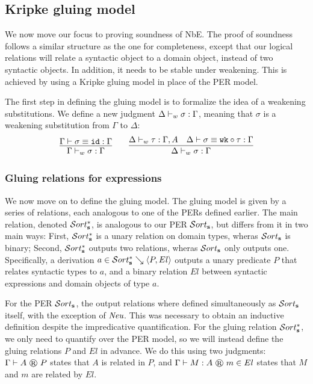 \subsection{Kripke gluing model}

We now move our focus to proving soundness of \ac{NbE}.
The proof of soundness follows a similar structure as the one for completeness,
  except that our logical relations will relate a syntactic object to a domain object, instead of two syntactic objects.
In addition, it needs to be stable under weakening.
This is achieved by using a Kripke gluing model in place of the PER model.

The first step in defining the gluing model is to formalize the idea of a weakening substitutions.
We define a new judgment $\Delta \vdash_{w} \sigma : \Gamma$, meaning that $\sigma$ is a weakening substitution from $\Gamma$ to $\Delta$:
\[
\begin{array}{c}
  \infer{
    \wfwk \Gamma \sigma \Gamma
  }{
    \eqsub \Gamma \sigma {\subid} \Gamma
  }
  \qquad
  \infer{
    \wfwk \Delta \sigma \Gamma
  }{
    \wfwk \Delta \tau {\ctxext \Gamma A}
    &
    \eqsub \Delta \sigma {\subclo \subwk \tau} \Gamma
  }
\end{array}
\]


\subsubsection{Gluing relations for expressions}

We now move on to define the gluing model.
The gluing model is given by a series of relations, each analogous to one of the \acp{PER} defined earlier.
The main relation, denoted $\glusort$, is analogous to our PER $\persort$, but differs from it in two main ways:
First, $\glusort$ is a unary relation on domain types, wheras $\persort$ is binary;
Second, $\glusort$ outputs two relations, wheras $\persort$ only outputs one.
Specifically, a derivation $\glusortrel a P {El}$ outputs a unary predicate $P$ that relates syntactic types to $a$,
  and a binary relation $El$ between syntactic expressions and domain objects of type $a$.

For the PER $\persort$, the output relations where defined simultaneously as $\persort$ itself, with the exception of ${\normalfont\textit{Neu}}$.
This was necessary to obtain an inductive definition despite the impredicative quantification.
For the gluing relation $\glusort$, we only need to quantify over the PER model, so we will instead define the gluing relations $P$ and $El$ in advance.
We do this using two judgments:
$\glutpjudg \Gamma A P$ states that $A$ is related in $P$,
and $\glutmjudg \Gamma M A m {El}$ states that $M$ and $m$ are related by $El$.

